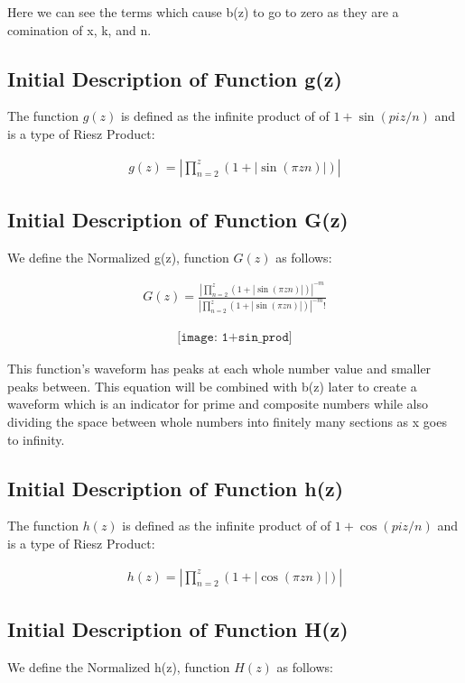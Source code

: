 \documentclass{article}
\begin{document}
Here we can see the terms which cause b(z) to go to zero as they are a comination of x, k, and n. \\

\subsection*{Initial Description of Function g(z)}
The function $g(z)$ is defined as the infinite product of  of $1 + \sin(piz/n)$ and is a type of Riesz Product:

\begin{align*}
	g(z) = |\prod_{n=2}^z \left(1 + |\sin\left(\pi z n\right)|\right)|
\end{align*}

\subsection*{Initial Description of Function G(z)}
We define the Normalized g(z), function $G(z)$ as follows:

\begin{align*}
	G(z) = \frac{|\prod_{n=2}^z \left(1 + |\sin\left(\pi z n\right)|\right)|^{-m}}{|\prod_{n=2}^z \left(1 + |\sin\left(\pi z n\right)|\right)|^{-m}!}
\end{align*} 

\begin{align*}
\texttt{[image: 1+sin\_prod]}
\end{align*}

This function's waveform has peaks at each whole number value and smaller peaks between. This equation will be combined with b(z) later to create a waveform which is an indicator for prime and composite numbers while also dividing the space between whole numbers into finitely many sections as x goes to infinity.

\subsection*{Initial Description of Function h(z)}
The function $h(z)$ is defined as the infinite product of  of $1 + \cos(piz/n)$ and is a type of Riesz Product:

\begin{align*}
	h(z) = |\prod_{n=2}^z \left(1 + |\cos\left(\pi z n\right)|\right)|
\end{align*}

\subsection*{Initial Description of Function H(z)}
We define the Normalized h(z), function $H(z)$ as follows:
\end{document}
